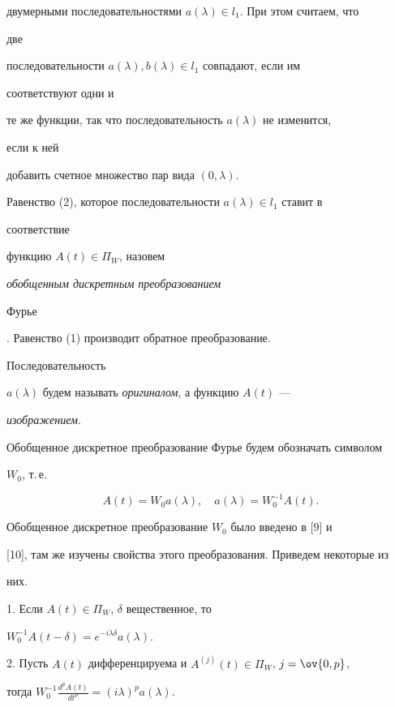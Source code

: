 двумерными последовательностями $a(\lambda)\in l_1$. При этом считаем, что 


две 


последовательности $a(\lambda),b(\lambda)\in l_1$ совпадают, если им 


соответствуют одни и 


те же функции, так что последовательность $a(\lambda)$ не изменится, 


если к ней  


добавить счетное множество пар вида $(0,\lambda)$. 


 


Равенство (2), которое последовательности $a(\lambda)\in l_1$ ставит в 


соответствие  


функцию $A(t)\in\Pi_W$, назовем {\it обобщенным дискретным преобразованием  


Фурье}. Равенство (1) производит обратное преобразование. 


Последовательность 


$a(\lambda)$ будем называть {\it оригиналом}, а функцию $A(t)$ --- 


{\it изображением}. 


Обобщенное дискретное преобразование Фурье будем обозначать символом 


$W_0$, т.\,е.  


$$ 


A(t)=W_0a(\lambda),\quad a(\lambda)=W^{-1}_0A(t). 


$$ 


Обобщенное дискретное преобразование $W_0$ было введено в [9] и  


[10], там же изучены свойства этого преобразования. Приведем некоторые из  


них. 


 


1. Если $A(t)\in\Pi_W$, $\delta$ вещественное, то 


$W^{-1}_0A(t-\delta)=e^{-i\lambda\delta}a(\lambda)$. 


 


2. Пусть $A(t)$ дифференцируема и $A^{(j)}(t)\in\Pi_W$, $j=\ov{0,p}$, 


тогда $W^{-1}_0\frac{d^p A(t)}{dt^p}=(i\lambda)^p a(\lambda)$. 


 



